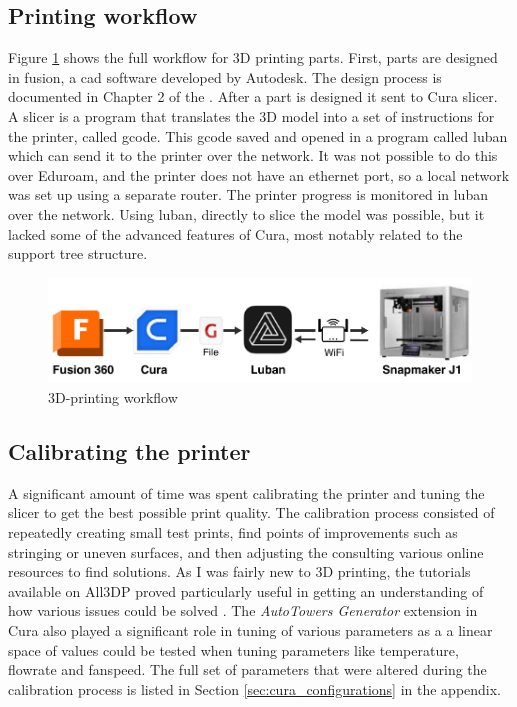 \subsection{Printing workflow}
Figure \ref{fig:3dp_workflow} shows the full workflow for 3D printing parts.
First, parts are designed in \gls{fusion}, a \gls{cad} software developed by Autodesk.
The design process is documented in Chapter 2 of the \preproject.
After a part is designed it sent to Cura slicer.
A slicer is a program that translates the 3D model into a set of instructions for the printer, called \gls{gcode}.
This \gls{gcode} saved and opened in a program called \gls{luban} which can send it to the printer over the network.
It was not possible to do this over Eduroam, and the printer does not have an ethernet port, so a local network was set up using a separate router.
The printer progress is monitored in \gls{luban} over the network.
Using \gls{luban}, directly to slice the model was possible, but it lacked some of the advanced features of Cura, most notably related to the support tree structure.


\begin{figure}[H]
    \centering
    \includegraphics[width=\textwidth]{figures/3d_print/pipeline.pdf}
    \caption{3D-printing workflow \cite{autodeskFusion360Logo} \cite{delaragoCuraLogo2022} \cite{jupi007GcodeIconProposal2020} \cite{snapmakerSnapmakerLogo2020} \cite{snapmakerSnapmakerJ1High}}
    \label{fig:3dp_workflow}
\end{figure}

\subsection{Calibrating the printer}
A significant amount of time was spent calibrating the printer and tuning the slicer to get the best possible print quality.
The calibration process consisted of repeatedly creating small test prints, find points of improvements such as stringing or uneven surfaces, and then adjusting the consulting various online resources to find solutions.
As I was fairly new to 3D printing, the tutorials available on All3DP proved particularly useful in getting an understanding of how various issues could be solved \cite{all3dpBasicsArchives}.
The \textit{AutoTowers Generator} extension in Cura also played a significant role in tuning of various parameters as a a linear space of values could be tested when tuning parameters like temperature, flowrate and fanspeed. \cite{kartchnerAutoTowersGeneratorUltimaker2022}
The full set of parameters that were altered during the calibration process is listed in Section \ref{sec:cura_configurations} in the appendix.

